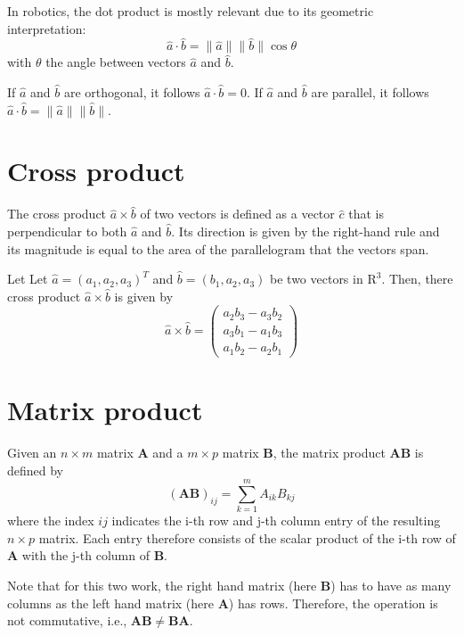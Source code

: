 \documentclass[paper=6.14in:9.21in,pagesize=pdftex,11pt,twoside,openright]{scrbook}
\begin{document}
In robotics, the dot product is mostly relevant due to its geometric interpretation:
\begin{equation}
\hat{a}\cdot\hat{b}=\|\hat{a}\|\|\hat{b}\|\cos\theta
\end{equation}
with $\theta$ the angle between vectors $\hat{a}$ and $\hat{b}$. 

If $\hat{a}$ and $\hat{b}$ are orthogonal, it follows $\hat{a}\cdot\hat{b}=0$. If $\hat{a}$ and $\hat{b}$ are parallel, it follows $\hat{a}\cdot\hat{b}=\|\hat{a}\|\|\hat{b}\|$.  

\section{Cross product}
The cross product $\hat{a} \times \hat{b}$ of two vectors is defined as a vector $\hat{c}$ that is perpendicular to both $\hat{a}$ and $\hat{b}$. Its direction is given by the right-hand rule and its magnitude is equal to the area of the parallelogram that the vectors span.  

Let Let $\hat{a}=(a_1,a_2,a_3)^T$ and $\hat{b}=(b_1,a_2,a_3)$ be two vectors in $\mathrm{R}^3$. Then, there cross product $\hat{a}\times\hat{b}$ is given by
\begin{equation}
\hat{a}\times\hat{b}=\left(
\begin{array}{l}
a_2b_3-a_3b_2\\
a_3b_1-a_1b_3\\
a_1b_2-a_2b_1
\end{array}
\right)
\end{equation}


\section{Matrix product}
Given an $n \times m$ matrix $\mathbf{A}$ and a $m\times p$ matrix $\mathbf{B}$, the matrix product $\mathbf{AB}$ is defined by
\begin{equation}
(\mathbf{AB})_{ij}=\sum_{k=1}^mA_{ik}B_{kj}
\end{equation}
where the index $ij$ indicates the i-th row and j-th column entry of the resulting $n\times p $ matrix. Each entry therefore consists of the scalar product of the i-th row of $\mathbf{A}$ with the j-th column of $\mathbf{B}$. 

Note that for this two work, the right hand matrix (here $\mathbf{B}$) has to have as many columns as the left hand matrix (here $\mathbf{A}$) has rows. Therefore, the operation is not commutative, i.e., $\mathbf{AB}\neq\mathbf{BA}$.
\end{document}
